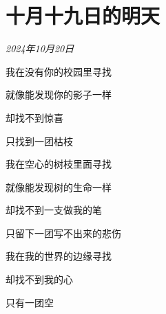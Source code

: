 \section*{十月十九日的明天}
\begin{center}
\textit{2024年10月20日}
\par
\vspace{2ex}
我在没有你的校园里寻找\par
就像能发现你的影子一样\par
却找不到惊喜\par
只找到一团枯枝\par
\vspace{2ex}
我在空心的树枝里面寻找\par
就像能发现树的生命一样\par
却找不到一支做我的笔\par
只留下一团写不出来的悲伤\par
\vspace{2ex}
我在我的世界的边缘寻找\par
却找不到我的心\par
只有一团空
\end{center}
